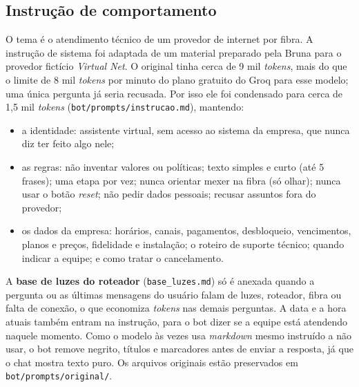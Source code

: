 \documentclass[11pt,a4paper]{article}
\newcommand{\cod}[1]{\texttt{#1}}
\begin{document}
\subsection{Instrução de comportamento}
O tema é o atendimento técnico de um provedor de internet por fibra. A instrução de sistema foi
adaptada de um material preparado pela Bruna para o provedor fictício \emph{Virtual Net}. O original
tinha cerca de 9 mil \emph{tokens}, mais do que o limite de 8 mil \emph{tokens} por minuto do plano
gratuito do Groq para esse modelo; uma única pergunta já seria recusada. Por isso ele foi condensado
para cerca de 1,5 mil \emph{tokens} (\cod{bot/prompts/instrucao.md}), mantendo:
\begin{itemize}
  \item a identidade: assistente virtual, sem acesso ao sistema da empresa, que nunca diz ter feito
        algo nele;
  \item as regras: não inventar valores ou políticas; texto simples e curto (até 5 frases); uma
        etapa por vez; nunca orientar mexer na fibra (só olhar); nunca usar o botão \emph{reset}; não
        pedir dados pessoais; recusar assuntos fora do provedor;
  \item os dados da empresa: horários, canais, pagamentos, desbloqueio, vencimentos, planos e
        preços, fidelidade e instalação; o roteiro de suporte técnico; quando indicar a equipe; e
        como tratar o cancelamento.
\end{itemize}
A \textbf{base de luzes do roteador} (\cod{base\_luzes.md}) só é anexada quando a pergunta ou as últimas
mensagens do usuário falam de luzes, roteador, fibra ou falta de conexão, o que economiza
\emph{tokens} nas demais perguntas. A data e a hora atuais também entram na instrução, para o bot
dizer se a equipe está atendendo naquele momento. Como o modelo às vezes usa \emph{markdown} mesmo
instruído a não usar, o bot remove negrito, títulos e marcadores antes de enviar a resposta, já que o
chat mostra texto puro. Os arquivos originais estão preservados em \cod{bot/prompts/original/}.
\end{document}

